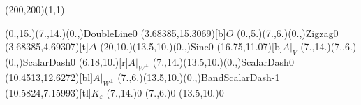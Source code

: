 \unitlength=1bp%

\begin{feynartspicture}(200,200)(1,1)

\FADiagram{}
\FAProp(0.,15.)(7.,14.)(0.,){DoubleLine}{0}
\FALabel(3.68385,15.3069)[b]{$O$}
\FAProp(0.,5.)(7.,6.)(0.,){Zigzag}{0}
\FALabel(3.68385,4.69307)[t]{$\Delta$}
\FAProp(20,10.)(13.5,10.)(0.,){Sine}{0}
\FALabel(16.75,11.07)[b]{$A|_V$}
\FAProp(7.,14.)(7.,6.)(0.,){ScalarDash}{0}
\FALabel(6.18,10.)[r]{$A|_{W^\perp}$}
\FAProp(7.,14.)(13.5,10.)(0.,){ScalarDash}{0}
\FALabel(10.4513,12.6272)[bl]{$A|_{W^\perp}$}
\FAProp(7.,6.)(13.5,10.)(0.,){BandScalarDash}{-1}
\FALabel(10.5824,7.15993)[tl]{$K_\varepsilon$}
\FAVert(7.,14.){0}
\FAVert(7.,6.){0}
\FAVert(13.5,10.){0}
\end{feynartspicture}

